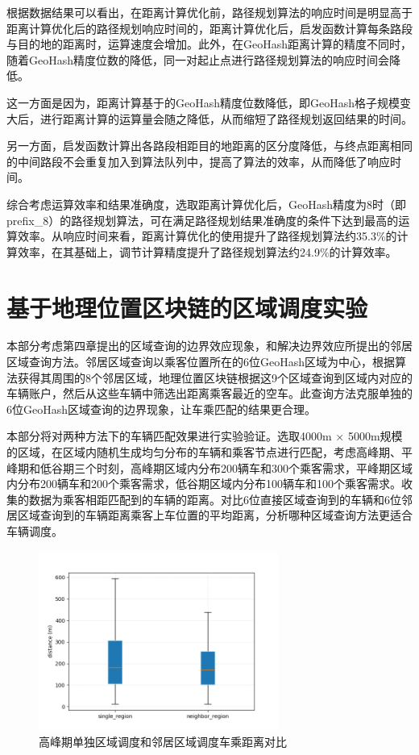 根据数据结果可以看出，在距离计算优化前，路径规划算法的响应时间是明显高于距离计算优化后的路径规划响应时间的，距离计算优化后，启发函数计算每条路段与目的地的距离时，运算速度会增加。此外，在GeoHash距离计算的精度不同时，随着GeoHash精度位数的降低，同一对起止点进行路径规划算法的响应时间会降低。

这一方面是因为，距离计算基于的GeoHash精度位数降低，即GeoHash格子规模变大后，进行距离计算的运算量会随之降低，从而缩短了路径规划返回结果的时间。

另一方面，启发函数计算出各路段相距目的地距离的区分度降低，与终点距离相同的中间路段不会重复加入到算法队列中，提高了算法的效率，从而降低了响应时间。

综合考虑运算效率和结果准确度，选取距离计算优化后，GeoHash精度为8时（即prefix\_8）的路径规划算法，可在满足路径规划结果准确度的条件下达到最高的运算效率。从响应时间来看，距离计算优化的使用提升了路径规划算法约35.3$\%$的计算效率，在其基础上，调节计算精度提升了路径规划算法约24.9$\%$的计算效率。

\section{基于地理位置区块链的区域调度实验}

本部分考虑第四章提出的区域查询的边界效应现象，和解决边界效应所提出的邻居区域查询方法。邻居区域查询以乘客位置所在的6位GeoHash区域为中心，根据算法获得其周围的8个邻居区域，地理位置区块链根据这9个区域查询到区域内对应的车辆账户，然后从这些车辆中筛选出距离乘客最近的空车。此查询方法克服单独的6位GeoHash区域查询的边界现象，让车乘匹配的结果更合理。

本部分将对两种方法下的车辆匹配效果进行实验验证。选取4000m × 5000m规模的区域，在区域内随机生成均匀分布的车辆和乘客节点进行匹配，考虑高峰期、平峰期和低谷期三个时刻，高峰期区域内分布200辆车和300个乘客需求，平峰期区域内分布200辆车和200个乘客需求，低谷期区域内分布100辆车和100个乘客需求。收集的数据为乘客相距匹配到的车辆的距离。对比6位直接区域查询到的车辆和6位邻居区域查询到的车辆距离乘客上车位置的平均距离，分析哪种区域查询方法更适合车辆调度。

\begin{figure}[h]
  \centering
  \includegraphics[height=0.3\textheight,width=0.7\textwidth]{figures/高峰车乘匹配}
  \caption{高峰期单独区域调度和邻居区域调度车乘距离对比}\label{fig:highRegionDistance}
\end{figure}

